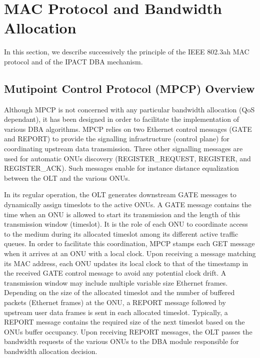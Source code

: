 \documentclass[a4paper,10pt]{IEEEtran}
\begin{document}
\section{MAC Protocol and Bandwidth Allocation}
In this section, we describe successively the principle of the IEEE
802.3ah MAC protocol and of the IPACT DBA mechanism.
\subsection{Mutipoint Control Protocol (MPCP) Overview}
Although MPCP is not concerned with any particular bandwidth
allocation (QoS dependant), it has been designed in order to
facilitate the implementation of various DBA algorithms. MPCP relies
on two Ethernet control messages (GATE and REPORT) to provide the
signalling infrastructure (control plane) for coordinating upstream
data transmission. Three other signalling messages are used for
automatic ONUs discovery (REGISTER\_REQUEST, REGISTER, and
REGISTER\_ACK). Such messages enable for instance distance
equalization between the OLT and the various ONUs.

In its regular operation, the OLT generates downstream GATE messages
to dynamically assign timeslots to the active ONUs. A GATE message
contains the time when an ONU is allowed to start its transmission
and the length of this transmission window (timeslot). It is the
role of each ONU to coordinate access to the medium during its
allocated timeslot among its different active traffic queues. In
order to facilitate this coordination, MPCP stamps each GET message
when it arrives at an ONU with a local clock. Upon receiving a
message matching its MAC address, each ONU updates its local clock
to that of the timestamp in the received GATE control message to
avoid any potential clock drift. A transmission window may include
multiple variable size Ethernet frames. Depending on the size of the
allocated timeslot and the number of buffered packets (Ethernet
frames) at the ONU, a REPORT message followed by upstream user data
frames is sent in each allocated timeslot. Typically, a REPORT
message contains the required size of the next timeslot based on the
ONUs buffer occupancy. Upon receiving REPORT messages, the OLT
passes the bandwidth requests of the various ONUs to the DBA module
responsible for bandwidth allocation decision.
\end{document}
